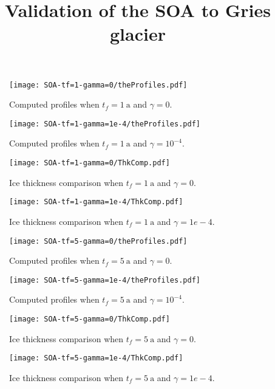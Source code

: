 \documentclass[a4paper, 12pt]{article}
\title{Validation of the SOA to Gries glacier}
\begin{document}
\maketitle
\begin{figure}
\centering
\texttt{[image: SOA-tf=1-gamma=0/theProfiles.pdf]}
\caption{Computed profiles when $t_f=1~\mathrm{a}$ and $\gamma=0$.}
\end{figure}

\begin{figure}
\centering
\texttt{[image: SOA-tf=1-gamma=1e-4/theProfiles.pdf]}
\caption{Computed profiles when $t_f=1~\mathrm{a}$ and $\gamma=10^{-4}$.}
\end{figure}

\begin{figure}
\centering
\texttt{[image: SOA-tf=1-gamma=0/ThkComp.pdf]}
\caption{Ice thickness comparison when $t_f=1~\mathrm{a}$ and $\gamma=0$.}
\end{figure}

\begin{figure}
\centering
\texttt{[image: SOA-tf=1-gamma=1e-4/ThkComp.pdf]}
\caption{Ice thickness comparison when $t_f=1~\mathrm{a}$ and $\gamma=1e-4$.}
\end{figure}

\begin{figure}
\centering
\texttt{[image: SOA-tf=5-gamma=0/theProfiles.pdf]}
\caption{Computed profiles when $t_f=5~\mathrm{a}$ and $\gamma=0$.}
\end{figure}

\begin{figure}
\centering
\texttt{[image: SOA-tf=5-gamma=1e-4/theProfiles.pdf]}
\caption{Computed profiles when $t_f=5~\mathrm{a}$ and $\gamma=10^{-4}$.}
\end{figure}

\begin{figure}
\centering
\texttt{[image: SOA-tf=5-gamma=0/ThkComp.pdf]}
\caption{Ice thickness comparison when $t_f=5~\mathrm{a}$ and $\gamma=0$.}
\end{figure}

\begin{figure}
\centering
\texttt{[image: SOA-tf=5-gamma=1e-4/ThkComp.pdf]}
\caption{Ice thickness comparison when $t_f=5~\mathrm{a}$ and $\gamma=1e-4$.}
\end{figure}
\end{document}
